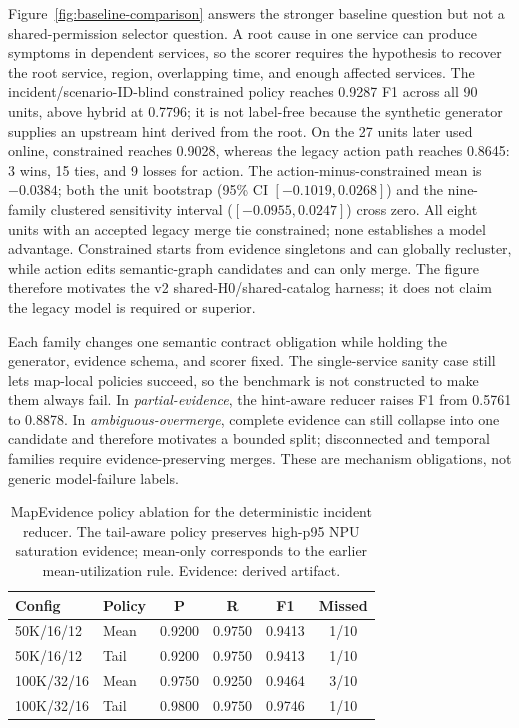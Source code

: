 \documentclass[sigplan,anonymous,nonacm]{acmart}
\begin{document}
Figure~\ref{fig:baseline-comparison} answers the stronger baseline question but not a shared-permission selector question. A root cause in one service can produce symptoms in dependent services, so the scorer requires the hypothesis to recover the root service, region, overlapping time, and enough affected services. The incident/scenario-ID-blind constrained policy reaches 0.9287 F1 across all 90 units, above hybrid at 0.7796; it is not label-free because the synthetic generator supplies an upstream hint derived from the root. On the 27 units later used online, constrained reaches 0.9028, whereas the legacy action path reaches 0.8645: 3 wins, 15 ties, and 9 losses for action. The action-minus-constrained mean is $-0.0384$; both the unit bootstrap (95\% CI $[-0.1019,0.0268]$) and the nine-family clustered sensitivity interval ($[-0.0955,0.0247]$) cross zero. All eight units with an accepted legacy merge tie constrained; none establishes a model advantage. Constrained starts from evidence singletons and can globally recluster, while action edits semantic-graph candidates and can only merge. The figure therefore motivates the v2 shared-H0/shared-catalog harness; it does not claim the legacy model is required or superior.

Each family changes one semantic contract obligation while holding the generator, evidence schema, and scorer fixed. The single-service sanity case still lets map-local policies succeed, so the benchmark is not constructed to make them always fail. In \emph{partial-evidence}, the hint-aware reducer raises F1 from 0.5761 to 0.8878. In \emph{ambiguous-overmerge}, complete evidence can still collapse into one candidate and therefore motivates a bounded split; disconnected and temporal families require evidence-preserving merges. These are mechanism obligations, not generic model-failure labels.

\begin{table}[t]
\caption{MapEvidence policy ablation for the deterministic incident reducer. The tail-aware policy preserves high-p95 NPU saturation evidence; mean-only corresponds to the earlier mean-utilization rule. Evidence: derived artifact.}
\label{tab:map-ablation}
\centering
\normalsize
\begin{tabular}{llcccc}
\toprule
Config & Policy & P & R & F1 & Missed \\
\midrule
50K/16/12 & Mean & 0.9200 & 0.9750 & 0.9413 & 1/10 \\
50K/16/12 & Tail & 0.9200 & 0.9750 & 0.9413 & 1/10 \\
100K/32/16 & Mean & 0.9750 & 0.9250 & 0.9464 & 3/10 \\
100K/32/16 & Tail & 0.9800 & 0.9750 & 0.9746 & 1/10 \\
\bottomrule
\end{tabular}
\end{table}
\end{document}
